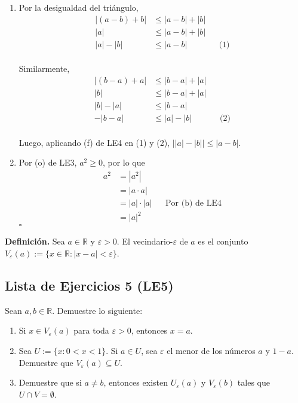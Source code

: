 \documentclass[11pt]{article}
\newcommand{\R}{\mathbb{R}}
\begin{document}
\begin{enumerate}[label=\alph*),font=\bfseries]
    
    \item Por la desigualdad del triángulo,
        \begin{align*}
            |(a-b)+b| &\leq |a-b|+|b| \\
            |a| &\leq |a-b|+|b| \\
            |a|-|b| &\leq |a-b| && \text{(1)}
        \end{align*} \\
        Similarmente, 
        \begin{align*}
            |(b-a)+a| &\leq |b-a|+|a| \\
            |b| &\leq |b-a|+|a| \\
            |b|-|a| &\leq |b-a| \\
            -|b-a| &\leq |a|-|b| && \text{(2)}
        \end{align*} \\
        Luego, aplicando (f) de LE4 en (1) y (2), $\big| |a| - |b| \big| \leq |a-b|$.


    \item Por (o) de LE3, $a^2\geq 0$, por lo que \begin{align*}
        a^2 &= |a^2|\\
        &= |a\cdot a|\\
        &= |a| \cdot |a| && \text{Por (b) de LE4}\\
        &= |a|^2
    \end{align*} \mbox{}\hfill $\square$
\end{enumerate} 


\textbf{Definición.} Sea $a \in \R$ y $\varepsilon>0$. El vecindario-$\varepsilon$ de $a$ es el conjunto $V_\varepsilon(a):=\{ x\in \R: |x-a|<\varepsilon\}$.

\subsection*{Lista de Ejercicios 5 (LE5)}

Sean $a,b \in \R$. Demuestre lo siguiente:

\begin{enumerate}[label=\alph*)]
    \item Si $x\in V_\varepsilon(a)$ para toda $\varepsilon>0$, entonces $x=a$.
    \item Sea $U:=\{x: 0<x<1\}$. Si $a\in U$, sea $\varepsilon$ el menor de los números $a$ y $1-a$. Demuestre que $V_\varepsilon(a) \subseteq U$.
    \item Demuestre que si $a\neq b$, entonces existen $U_\varepsilon(a)$ y $V_\varepsilon(b)$ tales que $U\cap V =\emptyset$.
\end{enumerate}
\end{document}
